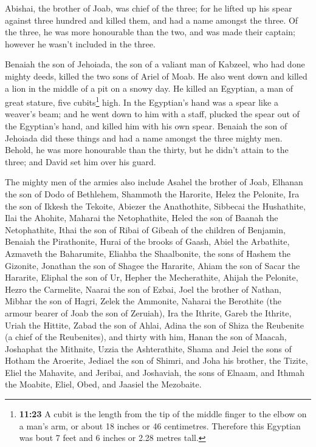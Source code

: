  Abishai, the brother of Joab, was chief of the three;
for he lifted up his spear against three hundred and killed them, and
had a name amongst the three.  Of the three, he was more
honourable than the two, and was made their captain; however he wasn't
included in the three.

 Benaiah the son of Jehoiada, the son of a valiant man of
Kabzeel, who had done mighty deeds, killed the two sons of Ariel of
Moab. He also went down and killed a lion in the middle of a pit on a
snowy day.  He killed an Egyptian, a man of great
stature, five cubits\footnote{\textbf{11:23} A cubit is the length from
  the tip of the middle finger to the elbow on a man's arm, or about 18
  inches or 46 centimetres. Therefore this Egyptian was bout 7 feet and
  6 inches or 2.28 metres tall.} high. In the Egyptian's hand was a
spear like a weaver's beam; and he went down to him with a staff,
plucked the spear out of the Egyptian's hand, and killed him with his
own spear.  Benaiah the son of Jehoiada did these things
and had a name amongst the three mighty men.  Behold, he
was more honourable than the thirty, but he didn't attain to the three;
and David set him over his guard.

 The mighty men of the armies also include Asahel the
brother of Joab, Elhanan the son of Dodo of Bethlehem, 
Shammoth the Harorite, Helez the Pelonite,  Ira the son
of Ikkesh the Tekoite, Abiezer the Anathothite,  Sibbecai
the Hushathite, Ilai the Ahohite,  Maharai the
Netophathite, Heled the son of Baanah the Netophathite, 
Ithai the son of Ribai of Gibeah of the children of Benjamin, Benaiah
the Pirathonite,  Hurai of the brooks of Gaash, Abiel the
Arbathite,  Azmaveth the Baharumite, Eliahba the
Shaalbonite,  the sons of Hashem the Gizonite, Jonathan
the son of Shagee the Hararite,  Ahiam the son of Sacar
the Hararite, Eliphal the son of Ur,  Hepher the
Mecherathite, Ahijah the Pelonite,  Hezro the Carmelite,
Naarai the son of Ezbai,  Joel the brother of Nathan,
Mibhar the son of Hagri,  Zelek the Ammonite, Naharai the
Berothite (the armour bearer of Joab the son of Zeruiah),
 Ira the Ithrite, Gareb the Ithrite, 
Uriah the Hittite, Zabad the son of Ahlai,  Adina the son
of Shiza the Reubenite (a chief of the Reubenites), and thirty with him,
 Hanan the son of Maacah, Joshaphat the Mithnite,
 Uzzia the Ashterathite, Shama and Jeiel the sons of
Hotham the Aroerite,  Jediael the son of Shimri, and Joha
his brother, the Tizite,  Eliel the Mahavite, and
Jeribai, and Joshaviah, the sons of Elnaam, and Ithmah the Moabite,
 Eliel, Obed, and Jaasiel the Mezobaite.

